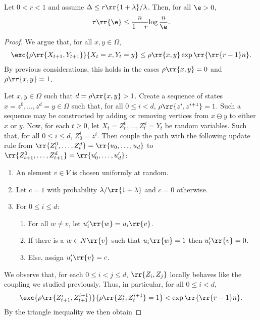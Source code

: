 \documentclass{article}
\begin{document}
\begin{claim*}[5]
  Let $0<r<1$ and assume $\Delta\leq r\rr{1+\lambda}/\lambda$. Then, for all $\e>0$,
  \begin{align*}
    \tau\rr{\e}\leq \frac{n}{1-r}{\log\frac{n}{\e}}.
  \end{align*}
  \begin{proof}
    We argue that, for all $x,y\in\Omega$,
    \begin{align*}
      \exc{\rho\rr{X_{t+1},Y_{t+1}}}{X_t=x,Y_t=y}\leq \rho\rr{x,y}\exp\rr{\rr{r-1}n}.
    \end{align*}
    By previous considerations, this holds in the cases $\rho\rr{x,y}=0$ and $\rho\rr{x,y}=1$.

    Let $x,y\in\Omega$ such that $d=\rho\rr{x,y}>1$. Create a sequence of states
    $x=z^0,\ldots,z^d=y\in\Omega$ such that, for all $0\leq i<d$, $\rho\rr{z^i,z^{i+1}}=1$.
    Such a sequence may be constructed by adding or removing vertices from $x\ominus y$ to
    either $x$ or $y$. Now, for each $t\geq 0$, let $X_t=Z_t^0,\ldots,Z_t^d=Y_t$ be random
    variables. Such that, for all $0\leq i\leq d$, $Z_0^i=z^i$. Then couple the path
    with the following update rule from $\rr{Z_t^0,\ldots,Z_t^d}=\rr{u_0,\ldots,u_d}$
    to $\rr{Z_{t+1}^0,\ldots,Z_{t+1}^d}=\rr{u'_0,\ldots,u'_d}$:
    \begin{enumerate}
      \item An element $v\in V$ is chosen uniformly at random.
      \item Let $c=1$ with probability $\lambda/\rr{1+\lambda}$ and $c=0$ otherwise.
      \item For $0\leq i\leq d$:
        \begin{enumerate}
          \item For all $w\neq v$, let $u'_i\rr{w}=u_i\rr{v}$.
          \item If there is a $w\in N\rr{v}$ such that $u_i\rr{w}=1$ then $u'_i\rr{v}=0$.
          \item Else, assign $u'_i\rr{v}=c$.
        \end{enumerate}
    \end{enumerate}
    We observe that, for each $0\leq i<j\leq d$, $\rr{Z_i,Z_j}$ locally behaves like the coupling we studied
    previously. Thus, in particular, for all $0\leq i<d$,
    \begin{align*}
      \exc{\rho\rr{Z_{t+1}^i,Z_{t+1}^{i+1}}}{\rho\rr{Z_t^i,Z_t^{i+1}}=1}<\exp\rr{\rr{r-1}n}.
    \end{align*}
    By the triangle inequality we then obtain

\end{proof}
\end{claim*}
\end{document}
